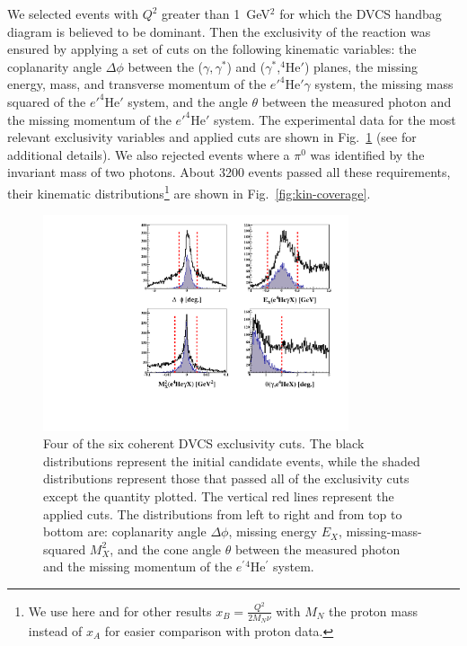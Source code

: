 \documentclass[twocolumn,nofootinbib,showpacs,prl,superscriptaddress,secnumarabic,amssymb,nobibnotes,aps,floatfix]{revtex4}
\begin{document}
We selected events with $Q^{2}$ greater than 1~GeV$^{2}$ for which the DVCS handbag 
diagram is believed to be dominant. Then the exclusivity of the reaction was ensured by 
applying a set of cuts on the following kinematic variables: the coplanarity 
angle $\Delta\phi$ between the ($\gamma,\gamma^*$) 
and ($\gamma^*$,$^4$He$'$) planes, the missing energy, mass, and transverse
momentum of the $e'^4$He$'\gamma$ system, the missing mass squared of 
the $e'^4$He$'$ system, and the angle $\theta$
between the measured photon and the missing momentum of the $e'^4$He$'$ system.  
The experimental data for the most relevant exclusivity variables and applied
cuts are shown in Fig.~\ref{fig:kin-cuts} (see \cite{Hattawy:thesis} for 
additional details). We also 
rejected events where a $\pi^0$ was identified by the invariant mass of 
two photons. About 3200 events passed all these requirements, their kinematic 
distributions\footnote{We use here and for other results 
$x_B =\frac{Q^2}{2M_N\nu}$ with $M_N$ the proton mass instead of $x_A$ for 
easier comparison with proton data.} are shown in Fig.~\ref{fig:kin-coverage}.

\begin{figure}[tb]
\centering
\hspace{-0.45cm}
\includegraphics[width=9cm]{figs/F_all_coh_exc_cuts-pub.pdf}
\caption{Four of the six coherent DVCS exclusivity cuts. The black 
distributions represent the initial candidate events, while the shaded 
distributions represent those that passed all of the exclusivity cuts except 
the quantity plotted. The vertical red lines represent the applied cuts.
The distributions from left to right and from top to bottom are: coplanarity 
angle $\Delta \phi$, missing energy $E_X$, missing-mass-squared $M_X^2$, and 
the cone angle $\theta$ between the measured photon and the missing momentum 
of the $e^\prime{^4}$He$^\prime$ system.}
\label{fig:kin-cuts}
\end{figure}
 
\end{document}

